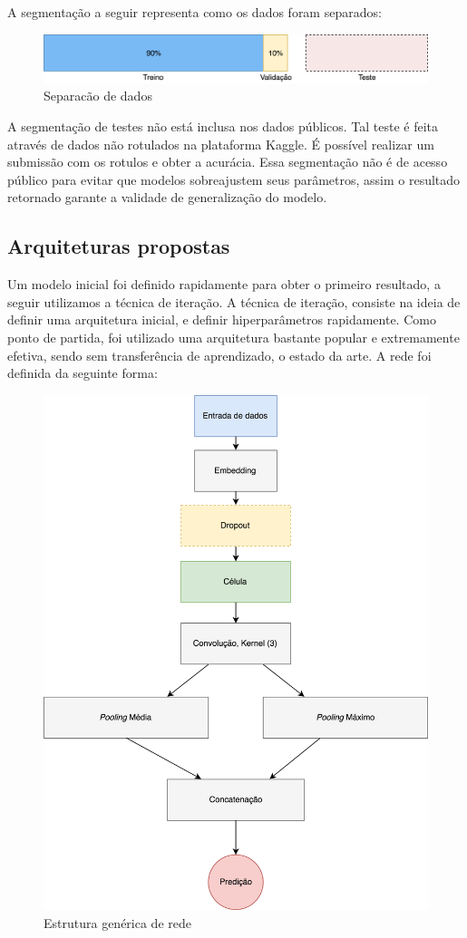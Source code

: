 \documentclass[12pt]{article}
\begin{document}
A segmentação a seguir representa como os dados foram separados:

\begin{figure}[ht]
\centering
\includegraphics[width=1\textwidth]{images/datasplit.png}
\caption{Separacão de dados}
\label{fig:datasplit}
\end{figure}

A segmentação de testes não está inclusa nos dados públicos. Tal teste é feita através de dados não rotulados na plataforma Kaggle. É possível realizar um submissão com os rotulos e obter a acurácia. Essa segmentação não é de acesso público para evitar que modelos sobreajustem seus parâmetros, assim o resultado retornado garante a validade de generalização do modelo.

\subsection{Arquiteturas propostas}

Um modelo inicial foi definido rapidamente para obter o primeiro resultado, a seguir utilizamos a técnica de iteração. A técnica de iteração, consiste na ideia de definir uma arquitetura inicial, e definir hiperparâmetros rapidamente. Como ponto de partida, foi utilizado uma arquitetura bastante popular e extremamente efetiva, sendo sem transferência de aprendizado, o estado da arte. A rede foi definida da seguinte forma:

\begin{figure}[ht]
\centering
\includegraphics[width=.5\textwidth]{images/graph.png}
\caption{Estrutura genérica de rede}
\label{fig:graph}
\end{figure}
\end{document}
